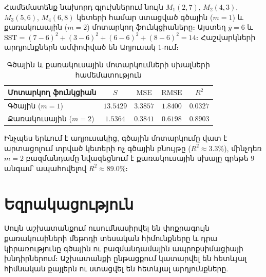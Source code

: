 \documentclass[12pt,a4paper]{article}
\numberwithin{equation}{section}
\numberwithin{figure}{section}
\begin{document}
Համեմատենք նախորդ գլուխներում նույն $M_1(2, 7)$, $M_2(4, 3)$, $M_3(5, 6)$, $M_4(6, 8)$ կետերի համար ստացված գծային ($m = 1$) և քառակուսային ($m = 2$) մոտարկող ֆունկցիաները։ Այստեղ $\bar{y} = 6$ և $\mathrm{SST} = (7-6)^2 + (3-6)^2 + (6-6)^2 + (8-6)^2 = 14$։ Հաշվարկների արդյունքներն ամփոփված են Աղյուսակ 1-ում։

\begin{table}[htbp]
    \centering
    \small
    \renewcommand{\arraystretch}{1.45}
    \caption{Գծային և քառակուսային մոտարկումների սխալների համեմատություն}
    \begin{tabular}{@{}p{4.3cm}cccc@{}}
        \toprule
        \textbf{Մոտարկող ֆունկցիան} & $S$ & $\mathrm{MSE}$ & $\mathrm{RMSE}$ & $R^2$ \tabularnewline
        \midrule
        \raggedright Գծային ($m = 1$) & $13.5429$ & $3.3857$ & $1.8400$ & $0.0327$ \tabularnewline
        \raggedright Քառակուսային ($m = 2$) & $1.5364$ & $0.3841$ & $0.6198$ & $0.8903$ \tabularnewline
        \bottomrule
    \end{tabular}
\end{table}

Ինչպես երևում է աղյուսակից, գծային մոտարկումը վատ է արտացոլում տրված կետերի ոչ գծային բնույթը ($R^2 \approx 3.3\%$), մինչդեռ $m = 2$ բազմանդամը նվազեցնում է քառակուսային սխալը գրեթե $9$ անգամ՝ ապահովելով $R^2 \approx 89.0\%$։
\newpage
\section*{Եզրակացություն}
{}

Սույն աշխատանքում ուսումնասիրվել են փոքրագույն քառակուսիների մեթոդի տեսական հիմունքները և դրա կիրառությունը գծային ու բազմանդամային ապրոքսիմացիայի խնդիրներում։ Աշխատանքի ընթացքում կատարվել են հետևյալ հիմնական քայլերն ու ստացվել են հետևյալ արդյունքները.
\end{document}
